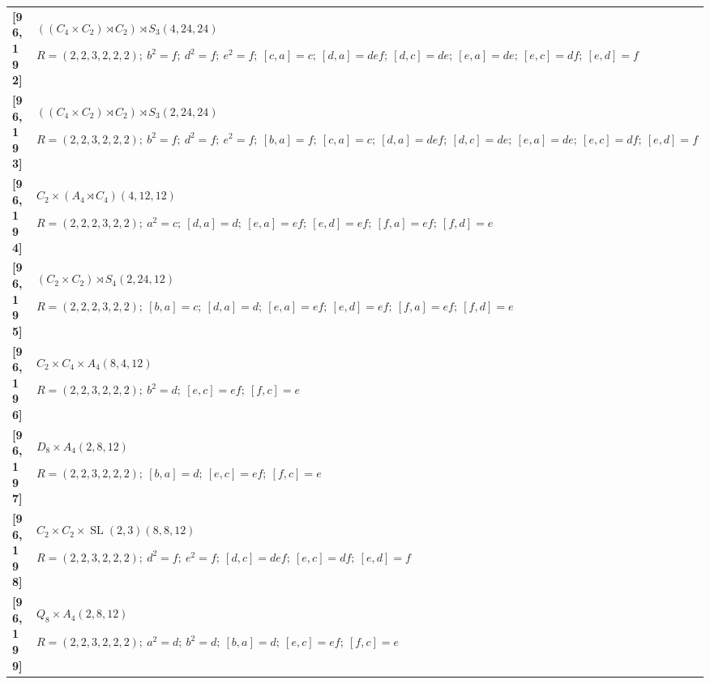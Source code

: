 \documentclass[UTF8,fontset=fandol,11pt,a4paper]{ctexart}
\begin{document}
\begin{longtable}{@{}p{17mm}>{\raggedright\arraybackslash}p{141mm}@{}}
\textbf{[96,192]} & $((C_{4}\times C_{2})\rtimes C_{2})\rtimes S_{3}$\quad $(4,24,24)$\par\(R=(2,2,3,2,2,2);\allowbreak\ b^{2}=f;\allowbreak\ d^{2}=f;\allowbreak\ e^{2}=f;\allowbreak\ [c,a]=c;\allowbreak\ [d,a]=def;\allowbreak\ [d,c]=de;\allowbreak\ [e,a]=de;\allowbreak\ [e,c]=df;\allowbreak\ [e,d]=f\)\\[3pt]

\textbf{[96,193]} & $((C_{4}\times C_{2})\rtimes C_{2})\rtimes S_{3}$\quad $(2,24,24)$\par\(R=(2,2,3,2,2,2);\allowbreak\ b^{2}=f;\allowbreak\ d^{2}=f;\allowbreak\ e^{2}=f;\allowbreak\ [b,a]=f;\allowbreak\ [c,a]=c;\allowbreak\ [d,a]=def;\allowbreak\ [d,c]=de;\allowbreak\ [e,a]=de;\allowbreak\ [e,c]=df;\allowbreak\ [e,d]=f\)\\[3pt]

\textbf{[96,194]} & $C_{2}\times (A_{4}\rtimes C_{4})$\quad $(4,12,12)$\par\(R=(2,2,2,3,2,2);\allowbreak\ a^{2}=c;\allowbreak\ [d,a]=d;\allowbreak\ [e,a]=ef;\allowbreak\ [e,d]=ef;\allowbreak\ [f,a]=ef;\allowbreak\ [f,d]=e\)\\[3pt]

\textbf{[96,195]} & $(C_{2}\times C_{2})\rtimes S_{4}$\quad $(2,24,12)$\par\(R=(2,2,2,3,2,2);\allowbreak\ [b,a]=c;\allowbreak\ [d,a]=d;\allowbreak\ [e,a]=ef;\allowbreak\ [e,d]=ef;\allowbreak\ [f,a]=ef;\allowbreak\ [f,d]=e\)\\[3pt]

\textbf{[96,196]} & $C_{2}\times C_{4}\times A_{4}$\quad $(8,4,12)$\par\(R=(2,2,3,2,2,2);\allowbreak\ b^{2}=d;\allowbreak\ [e,c]=ef;\allowbreak\ [f,c]=e\)\\[3pt]

\textbf{[96,197]} & $D_{8}\times A_{4}$\quad $(2,8,12)$\par\(R=(2,2,3,2,2,2);\allowbreak\ [b,a]=d;\allowbreak\ [e,c]=ef;\allowbreak\ [f,c]=e\)\\[3pt]

\textbf{[96,198]} & $C_{2}\times C_{2}\times \operatorname{SL}(2,3)$\quad $(8,8,12)$\par\(R=(2,2,3,2,2,2);\allowbreak\ d^{2}=f;\allowbreak\ e^{2}=f;\allowbreak\ [d,c]=def;\allowbreak\ [e,c]=df;\allowbreak\ [e,d]=f\)\\[3pt]

\textbf{[96,199]} & $Q_{8}\times A_{4}$\quad $(2,8,12)$\par\(R=(2,2,3,2,2,2);\allowbreak\ a^{2}=d;\allowbreak\ b^{2}=d;\allowbreak\ [b,a]=d;\allowbreak\ [e,c]=ef;\allowbreak\ [f,c]=e\)\\[3pt]


\end{longtable}
\end{document}
